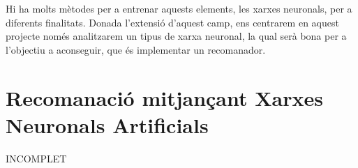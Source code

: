 Hi ha molts mètodes per a entrenar aquests elements, les xarxes neuronals, per a diferents finalitats. Donada l'extensió d'aquest camp, ens centrarem en aquest projecte només analitzarem un tipus de xarxa neuronal, la qual serà bona per a l'objectiu a aconseguir, que és implementar un recomanador.

\section{Recomanació mitjançant Xarxes Neuronals Artificials}
\label{sec:estat-de-lart-ann}
INCOMPLET

\begin{comment}
El camp de la recomanació mitjançant Xarxes Neuronals Artificials (d'ara en endevant ANN, que que són les sigles per a Artificial Neural Network) és un tema que ha estat tractat en multitut de tesis.

Es pot apreciar que és factible el desenvolupament d'una ANN mitjançant xarxes neuronals. És pot desenvolupar aquest sistema de recomanació tant basant-se en contingut (Content Based Filtering) com basant-se en les opinions dels demés usuaris d'una aplicació (Collaborative Filtering).

El principal problema de les xarxes neuronals és que tenen un temps d'aprenentatge molt llarg\cite{faster-ann-recomender}. Hi ha un estudi\cite{collaborative-filtering-som-cbr} que, el que fà, és utilitzar una ANN per tal de categoritzar els patrons dels usuaris. Aquest proces és dut com un proces \emph{off-line}, que no necesita ser executat cada cop que un usuari solicita una recomanació. Mitjançant alguns altres algoritmes d'aprenentatge, acaba donant recomanacions de forma considerablement ràpida.

Com es pot veure, hi ha hagut bastanta investigació en aquest camp, el que fa que disposem de bastanta documentació per a desenvolupar el projecte.
\end{comment}